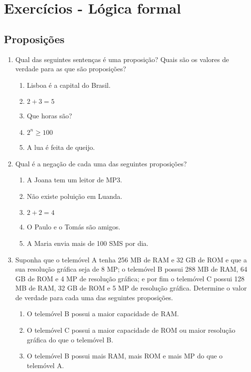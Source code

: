 \chapter*{Exercícios - Lógica formal}

\section*{Proposições}

\begin{enumerate}
  	\item Qual das seguintes sentenças é uma proposição? Quais são os valores de verdade para as que são proposições?
  	\begin{enumerate}
	  	  \item Lisboa é a capital do Brasil.
	  	  \item $2 + 3 = 5$
	  	  \item Que horas são?
	  	  \item $2^n \geq 100$
	  	  \item A lua é feita de queijo.
    \end{enumerate} 
    \item Qual é a negação de cada uma das seguintes proposições?
    \begin{enumerate}
	     \item A Joana tem um leitor de MP3.
	     \item Não existe poluição em Luanda.
	     \item $2 + 2 = 4$
	     \item O Paulo e o Tomás são amigos.
	     \item A Maria envia mais de 100 SMS por dia.
  	\end{enumerate}
  	\item Suponha que o telemóvel A tenha 256 MB de RAM e 32 GB de ROM e que a sua resolução gráfica seja de 8 MP; o telemóvel
  	B possui 288 MB de RAM, 64 GB de ROM e 4 MP de resolução gráfica; e por fim o telemóvel C possui 128 MB de RAM, 32 GB de ROM
  	e 5 MP de resolução gráfica. Determine o valor de verdade para cada uma das seguintes proposições.
  	\begin{enumerate}
  		 \item O telemóvel B possui a maior capacidade de RAM.
  		 \item O telemóvel C possui a maior capacidade de ROM ou maior resolução gráfica do que o telemóvel B.
  		 \item O telemóvel B possui mais RAM, mais ROM e mais MP do que o telemóvel A.

\end{enumerate}
\end{enumerate}
